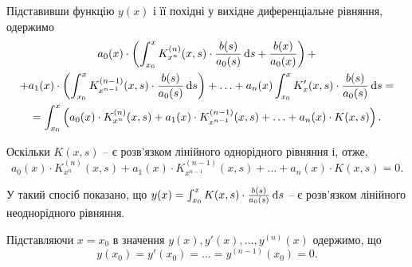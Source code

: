 Підставивши функцію $y(x)$ і її похідні у вихідне диференціальне рівняння, одержимо
\begin{multline*}
	a_0(x) \cdot \left( \int_{x_0}^x K_{x^n}^{(n)} (x, s) \cdot \frac{b(s)}{a_0(s)} \mathop{}\!\mathrm{d} s + \frac{b(x)}{a_0(x)} \right) + \\ + a_1(x) \cdot \left( \int_{x_0}^x K_{x^{n - 1}}^{(n - 1)} (x, s) \cdot \frac{b(s)}{a_0(s)} \mathop{}\!\mathrm{d} s \right) + \ldots + a_n(x) \int_{x_0}^x K_x' (x, s)  \cdot \frac{b(s)}{a_0(s)} \mathop{}\!\mathrm{d} s = \\ = \int_{x_0}^x \left( a_0(x) \cdot K_{x^n}^{(n)}(x, s) + a_1(x) \cdot K_{x^{n - 1}}^{(n - 1)}(x, s) + \ldots + a_n(x) \cdot K(x, s) \right).
\end{multline*}

Оскільки $K(x, s)$ -- є розв’язком лінійного однорідного рівняння і, отже,
\begin{equation*}
	a_0(x) \cdot K_{x^n}^{(n)}(x, s) + a_1(x) \cdot K_{x^{n - 1}}^{(n - 1)}(x, s) + \ldots + a_n(x) \cdot K(x, s) = 0.
\end{equation*}
 
У такий спосіб показано, що $y(x) = \int_{x_0}^x K(x, s) \cdot \frac{b(s)}{a_0(s)} \mathop{}\!\mathrm{d} s$ -- є розв’язком лінійного неоднорідного рівняння. \parvskip

Підставляючи $x = x_0$ в значення $y(x), y'(x), \ldots, y^{(n)}(x)$ одержимо, що
\begin{equation*}
	y(x_0) = y'(x_0) = \ldots = y^{(n - 1)}(x_0) = 0.
\end{equation*}

